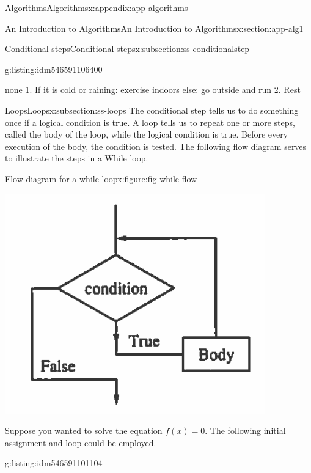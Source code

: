 \documentclass[oneside,10pt,]{book}
\numberwithin{equation}{section}
\begin{document}
\begin{appendixptx}{Algorithms}{}{Algorithms}{}{}{x:appendix:app-algorithms}
\begin{sectionptx}{An Introduction to Algorithms}{}{An Introduction to Algorithms}{}{}{x:section:app-alg1}
\begin{subsectionptx}{Conditional steps}{}{Conditional steps}{}{}{x:subsection:ss-conditionalstep}
\begin{listingptx}{}{g:listing:idm546591106400}{}%
\begin{program}{none}
1. If it is cold or raining:
		exercise indoors
	else: 
		go outside and run
2. Rest
\end{program}
\tcblower
\end{listingptx}%
\end{subsectionptx}
%
%
\typeout{************************************************}
\typeout{************************************************}
%
\begin{subsectionptx}{Loops}{}{Loops}{}{}{x:subsection:ss-loops}
The conditional step tells us to do something once if a logical condition is true. A  loop tells us to repeat one or more steps, called the body of the loop, while the logical condition is true. Before every execution of the body, the condition is tested. The following flow diagram serves to illustrate the steps in a While loop.%
\begin{figureptx}{Flow diagram for a while loop}{x:figure:fig-while-flow}{}%
\begin{image}{0}{1}{0}%
\includegraphics[width=\linewidth]{images/while-flow.png}
\end{image}%
\tcblower
\end{figureptx}%
Suppose you wanted to solve the equation \(f(x) = 0\). The following initial assignment and loop could be employed.%
\begin{listingptx}{}{g:listing:idm546591101104}{}%

\end{listingptx}
\end{subsectionptx}
\end{sectionptx}
\end{appendixptx}
\end{document}
